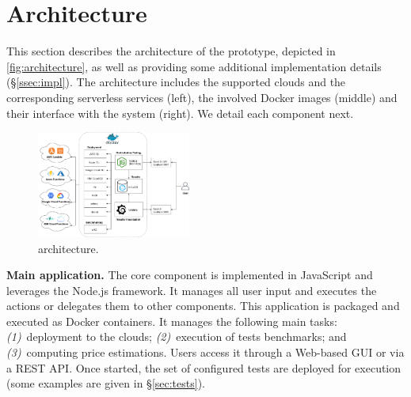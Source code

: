 \section{Architecture}
\label{sec:architecture}

This section describes the architecture of the \sys prototype, depicted in \autoref{fig:architecture}, as well as providing some additional implementation details (\S\ref{ssec:impl}).
The architecture includes the supported clouds and the corresponding serverless services (left), the involved Docker images (middle) and their interface with the system (right).
We detail each component next. 

\begin{figure}[!t]
\begin{center}
\includegraphics[width=0.45\textwidth]{bilder/main_app.png}
\caption{\sys architecture.}
\label{fig:architecture}
\end{center}
\end{figure}

\textbf{Main application.}
The \sys core component is implemented in JavaScript and leverages the Node.js framework. 
It manages all user input and executes the actions or delegates them to other components. 
This application is packaged and executed as Docker containers. 
It manages the following main tasks:
\emph{(1)}~deployment to the clouds;
\emph{(2)}~execution of tests benchmarks; and
\emph{(3)}~computing price estimations. 
Users access it through a Web-based \gls{GUI} or via a REST \gls{API}. 
Once started, the set of configured tests are deployed for execution (some examples are given in \S\ref{sec:tests}).

